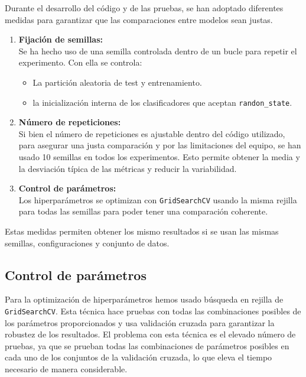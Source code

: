 Durante el desarrollo del código y de las pruebas, se han adoptado diferentes medidas para garantizar que las comparaciones entre modelos sean justas.

\begin{enumerate}
	\item \textbf{Fijación de semillas:}\\
		Se ha hecho uso de una semilla controlada dentro de un bucle para repetir el experimento. Con ella se controla:

		\begin{itemize}
			\item La partición aleatoria de test y entrenamiento.
			\item la inicialización interna de los clasificadores que aceptan \texttt{randon\_state}.
		\end{itemize}
	\item \textbf{Número de repeticiones:}\\
		Si bien el número de repeticiones es ajustable dentro del código utilizado, para asegurar una justa comparación y por las limitaciones del equipo, se han usado 10 semillas en todos los experimentos. Esto permite obtener la media y la desviación típica de las métricas y reducir la variabilidad.
	\item \textbf{Control de parámetros:}\\
		Los hiperparámetros se optimizan con \texttt{GridSearchCV} usando la misma rejilla para todas las semillas para poder tener una comparación coherente.
\end{enumerate}

Estas medidas permiten obtener los mismo resultados si se usan las mismas semillas, configuraciones y conjunto de datos.

\subsection{Control de parámetros}
\label{subsec:control}

Para la optimización de hiperparámetros hemos usado búsqueda en rejilla de \texttt{GridSearchCV}. Esta técnica hace pruebas con todas las combinaciones posibles de los parámetros proporcionados y usa validación cruzada para garantizar la robustez de los resultados. El problema con esta técnica es el elevado número de pruebas, ya que se prueban todas las combinaciones de parámetros posibles en cada uno de los conjuntos de la validación cruzada, lo que eleva el tiempo necesario de manera considerable.

